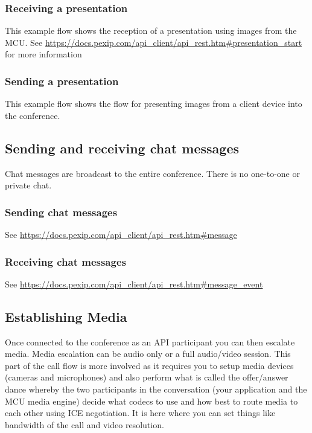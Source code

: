 \documentclass[a4paper,11pt]{article}
\begin{document}
\subsubsection{Receiving a presentation}
\label{sec:org906c019}

This example flow shows the reception of a presentation using images
from the MCU.  See
\url{https://docs.pexip.com/api\_client/api\_rest.htm\#presentation\_start} for
more information

\subsubsection{Sending a presentation}
\label{sec:org055a82d}

This example flow shows the flow for presenting images from a client
device into the conference.

\subsection{Sending and receiving chat messages}
\label{sec:orgf2fe624}

Chat messages are broadcast to the entire conference.  There is no
one-to-one or private chat.

\subsubsection{Sending chat messages}
\label{sec:orgc3004a6}

See \url{https://docs.pexip.com/api\_client/api\_rest.htm\#message}

\subsubsection{Receiving chat messages}
\label{sec:org4e37fd6}

See \url{https://docs.pexip.com/api\_client/api\_rest.htm\#message\_event}

\subsection{Establishing Media}
\label{sec:org371f7f1}

Once connected to the conference as an API participant you can then
escalate media.  Media escalation can be audio only or a full
audio/video session.  This part of the call flow is more involved as
it requires you to setup media devices (cameras and microphones) and
also perform what is called the offer/answer dance whereby the two
participants in the conversation (your application and the MCU media
engine) decide what codecs to use and how best to route media to each
other using ICE negotiation.  It is here where you can set things like
bandwidth of the call and video resolution.
\end{document}
